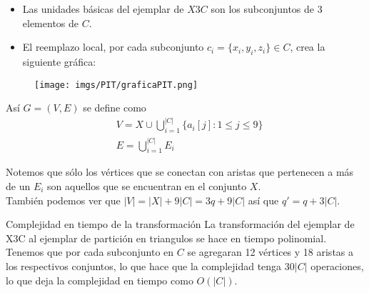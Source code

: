 \begin{frame}{\subsectiontitle}
    \begin{itemize}
        \itemj Sea $X$ el conjunto con $|X|=3q$ y la colección $C$ de subconjuntos de 3 elementos de $X$ un ejemplar de $X3C$, construiremos una gráfica $G=(V,E)$ con
    $|V|=3q'$ tal que la partición deseada exista para $G$ si y solo si $C$ contiene una cobertura exacta.
        \item Las unidades básicas del ejemplar de $X3C$ son los subconjuntos de 3 elementos de $C$.
        \item El reemplazo local, por cada subconjunto $c_i=\{x_i,y_i,z_i\}\in C$, crea la siguiente gráfica:
    \end{itemize}
\end{frame}
\begin{frame}{\subsectiontitle}
    \begin{figure}
    \centering
        \texttt{[image: imgs/PIT/graficaPIT.png]}
    \end{figure}
\end{frame}
\begin{frame}{\subsectiontitle}
    Así $G=(V,E)$ se define como
    \begin{align*}
        &V = X \cup \bigcup_{i=1}^{|C|} \{a_i[j]: 1\leqslant j\leqslant 9\}\\
        &E =\bigcup_{i=1}^{|C|}E_i
    \end{align*}

    Notemos que sólo los vértices que se conectan con aristas que pertenecen a más de un $E_i$ son aquellos que se encuentran en el conjunto $X$.\\

    \vspace{10pt}
    También podemos ver que $|V| = |X| + 9|C| = 3q + 9|C|$ así que $q'=q+3|C|$.
\end{frame}
\begin{frame}{Complejidad en tiempo de la transformación}
    La transformación del ejemplar de X3C al ejemplar de partición en triangulos se hace en tiempo polinomial. Tenemos que por cada subconjunto en $C$ se agregaran 12 vértices y 18 aristas a los respectivos conjuntos, lo que hace que la complejidad tenga $30|C|$ operaciones, lo que deja la complejidad en tiempo como $O(|C|)$.
\end{frame}

